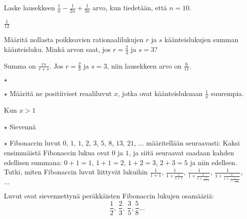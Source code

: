 \begin{tehtava}
	Laske lausekkeen $\frac{1}{n}-\frac{1}{2n}+\frac{1}{3n}$ arvo, kun tiedetään, että $n = 10$.
	\begin{vastaus}
		$\frac{1}{12}$
	\end{vastaus}
\end{tehtava}
\begin{tehtava}
	Määritä nollasta poikkeavien rationaalilukujen $r$ ja $s$ käänteislukujen summan käänteisluku. Minkä arvon saat, jos $r=\frac{2}{3}$ ja $s=3$?
	\begin{vastaus}
		Summa on $\frac{rs}{r+s}$. Jos $r=\frac{2}{3}$ ja $s=3$, niin lausekkeen arvo on $\frac{6}{11}$.
	\end{vastaus}
\end{tehtava}

\begin{tehtava} $\star$ 
	\begin{vastaus}
	\end{vastaus}
\end{tehtava}

\begin{tehtava} $\star$
	Määritä ne positiiviset reaaliluvut $x$, jotka ovat käänteislukuaan $\frac{1}{x}$ suurempia.
	\begin{vastaus}
	 Kun $x>1$
	\end{vastaus}
\end{tehtava}

\begin{tehtava} $\star $
Sievennä
 \begin{vastaus}
	\alakohdatm{
		§ $a+1$
		§ $4a$
	}
 \end{vastaus}
\end{tehtava}

\begin{tehtava}
	$\star$ Fibonaccin luvut $0$, $1$, $1$, $2$, $3$, $5$, $8$, $13$, $21$, $\ldots$ määritellään seuraavasti: Kaksi ensimmäistä Fibonaccin lukua ovat $0$ ja $1$, ja siitä seuraavat saadaan kahden edellisen summana: $0+1=1$, $1+1=2$, $1+2 = 3$, $2+3=5 $ ja niin edelleen. Tutki, miten Fibonaccin luvut liittyvät lukuihin
	$ \frac{1}{1+1}$, $\frac{1}{1+\frac{1}{1+1}}$, 
	$\frac{1}{1+\frac{1}{1+\frac{1}{1+1}}}$, 
	$\frac{1}{1+\frac{1}{1+\frac{1}{1+\frac{1}{1+1}}}}$, $\ldots\ $
	\begin{vastaus}
		Luvut ovat sievennettynä peräkkäisten Fibonaccin lukujen osamääriä:
		\[\frac{1}{2}, \ \frac{2}{3}, \ \frac{3}{5}, \frac{5}{8} \ldots  \]
	\end{vastaus}
\end{tehtava}